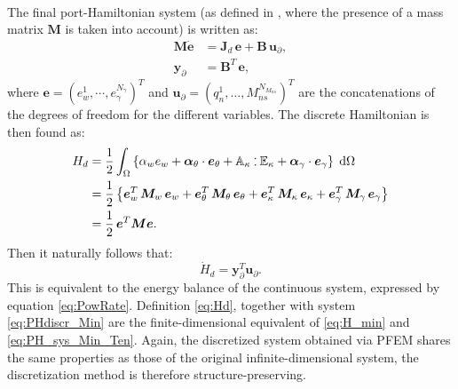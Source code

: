 \documentclass[preprint,12pt]{elsarticle}
\def\onedot{$\mathsurround0pt\ldotp$}
\def\cddot{%
	\mathbin{\vcenter{\baselineskip.67ex
			\hbox{\onedot}\hbox{\onedot}}%
}}
\begin{document}
{\begin{equation}
\begin{aligned}
\end{aligned}
\end{equation}
The final port-Hamiltonian system (as defined in \cite{beattie2018linear}, where the presence of a mass matrix $\bm{M}$ is taken into account) is written as:
\begin{equation}
\label{eq:PHdiscr_Min}
\begin{aligned}
\bm{M} \dot{\bm{e}} &= \bm{J}_d  \,\bm{e} + \bm{B} \, \bm{u}_{\partial}, \\
\bm{y}_{\partial} &= \bm{B}^T \, \bm{e},
\end{aligned} 
\end{equation}
where $\bm{e} = \left(e_w^1, \cdots, e_{\gamma}^{N_{\gamma}}\right)^T$ and $\bm{u}_{\partial} = \left(q_n^1, \dots, M_{ns}^{N_{M_{ns}}}\right)^T$ are the concatenations of the degrees of freedom for the different variables. The discrete Hamiltonian is then found as:
\begin{equation}
\label{eq:Hd}
\begin{aligned}
H_d &= \frac{1}{2} \int_{\Omega} \left\{ \alpha_w e_w + \bm{\alpha}_\theta \cdot \bm{e}_{\theta} + \mathbb{A}_{\kappa} \cddot \mathbb{E}_\kappa + \bm\alpha_{\gamma} \cdot \bm{e}_{\gamma}  \right\} \d\Omega \\
 &=  \frac{1}{2}  \left\{ \bm{e}_w^T \, \bm{M}_w \, \bm{e}_w + \bm{e}_\theta^T \, \bm{M}_\theta \, \bm{e}_\theta + \bm{e}_\kappa^T \, \bm{M}_\kappa \, \bm{e}_\kappa + \bm{e}_{\gamma}^T \, \bm{M}_{\gamma} \, \bm{e}_{\gamma}  \right\} \\
 &=  \frac{1}{2} \, \bm{e}^T  \bm{M}  \bm{e}.
\end{aligned}
\end{equation}
}
Then it naturally follows that:
\begin{equation}
\dot{H}_d = \bm{y}_{\partial}^T \bm{u}_{\partial}.
\end{equation}
This is equivalent to the energy balance of the continuous system, expressed by equation \eqref{eq:PowRate}. Definition \eqref{eq:Hd}, together with system \eqref{eq:PHdiscr_Min} are the finite-dimensional equivalent of \eqref{eq:H_min} and  \eqref{eq:PH_sys_Min_Ten}. Again, the discretized system obtained via PFEM shares the same properties as those of the original infinite-dimensional system, the discretization method is therefore structure-preserving. \\
\end{document}
